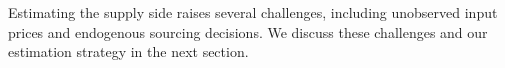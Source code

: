 \documentclass[11pt]{article}
\begin{document}
Estimating the supply side raises several challenges, including unobserved input prices and endogenous sourcing decisions. We discuss these challenges and our estimation strategy in the next section.

\end{document}
